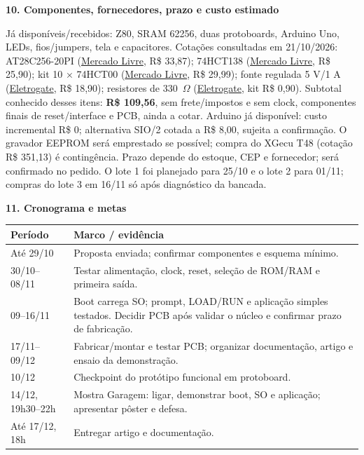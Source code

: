 \documentclass[10pt,a4paper]{article}
\newcommand{\field}[2]{\par\vspace{4pt}\noindent\textbf{#1. #2}\par\nopagebreak[4]}
\begin{document}
\field{10}{Componentes, fornecedores, prazo e custo estimado} Já disponíveis/recebidos: Z80, SRAM 62256, duas protoboards, Arduino Uno, LEDs, fios/jumpers, tela e capacitores. Cotações consultadas em 21/10/2026: AT28C256-20PI (\href{https://www.mercadolivre.com.br/circuito-integrado-at28c25620pi-dip28-pth-/up/MLBU2251963330}{Mercado Livre}, R\$ 33,87); 74HCT138 (\href{https://www.mercadolivre.com.br/circuito-integrado-decodificador-sn74hct138-com-16-pinos/p/MLB51325395}{Mercado Livre}, R\$ 25,90); kit 10 × 74HCT00 (\href{https://www.mercadolivre.com.br/kit-com-10--74hct00b1-74hct00-circuito-integrado-dip14/up/MLBU3425298485}{Mercado Livre}, R\$ 29,99); fonte regulada 5 V/1 A (\href{https://www.eletrogate.com/fonte-5v-1a}{Eletrogate}, R\$ 18,90); resistores de 330~$\Omega$ (\href{https://www.eletrogate.com/resistor-330r-1-4w-10-unidades}{Eletrogate}, kit R\$ 0,90). Subtotal conhecido desses itens: \textbf{R\$ 109,56}, sem frete/impostos e sem clock, componentes finais de reset/interface e PCB, ainda a cotar. Arduino já disponível: custo incremental R\$ 0; alternativa SIO/2 cotada a R\$ 8,00, sujeita a confirmação. O gravador EEPROM será emprestado se possível; compra do XGecu T48 (cotação R\$ 351,13) é contingência. Prazo depende do estoque, CEP e fornecedor; será confirmado no pedido. O lote 1 foi planejado para 25/10 e o lote 2 para 01/11; compras do lote 3 em 16/11 só após diagnóstico da bancada.

\field{11}{Cronograma e metas}
\begin{tabularx}{\linewidth}{@{}p{2.2cm}Y@{}}
\toprule Período & Marco / evidência\\\midrule
Até 29/10 & Proposta enviada; confirmar componentes e esquema mínimo.\\
30/10--08/11 & Testar alimentação, clock, reset, seleção de ROM/RAM e primeira saída.\\
09--16/11 & Boot carrega SO; prompt, LOAD/RUN e aplicação simples testados. Decidir PCB após validar o núcleo e confirmar prazo de fabricação.\\
17/11--09/12 & Fabricar/montar e testar PCB; organizar documentação, artigo e ensaio da demonstração.\\
10/12 & Checkpoint do protótipo funcional em protoboard.\\
14/12, 19h30--22h & Mostra Garagem: ligar, demonstrar boot, SO e aplicação; apresentar pôster e defesa.\\
Até 17/12, 18h & Entregar artigo e documentação.\\
\bottomrule
\end{tabularx}
\end{document}
